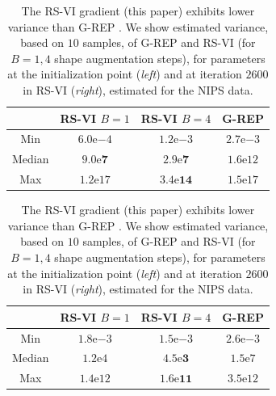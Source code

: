 \begin{table}[t]
\centering
\begin{subtable}{0.45\textwidth}
\begin{tabular}{cccc}
\toprule
 & \gls{RS-VI} $B=1$ & \gls{RS-VI} $B=4$ &\gls{G-REP}\\ \hline
Min & $6.0\mathrm{e}{-4}$ & $1.2\mathrm{e}{-3}$ & $2.7\mathrm{e}{-3}$\\
Median & $\mathbf{9.0\mathrm{e}{7}}$ & $\mathbf{2.9\mathrm{e}{7}}$ & $1.6\mathrm{e}{12}$\\
Max & $1.2\mathrm{e}{17}$ & $\mathbf{3.4\mathrm{e}{14}}$ & $1.5\mathrm{e}{17}$ \\ \bottomrule 
\end{tabular}
\end{subtable}
\hspace*{15pt}
\begin{subtable}{0.45\textwidth}
\begin{tabular}{cccc}
\toprule
 & \gls{RS-VI} $B=1$ & \gls{RS-VI} $B=4$ &\gls{G-REP}\\ \hline
Min & $1.8\mathrm{e}{-3}$ & $1.5\mathrm{e}{-3}$ & $2.6\mathrm{e}{-3}$\\
Median & $1.2\mathrm{e}{4}$ & $\mathbf{4.5\mathrm{e}{3}}$ & $1.5\mathrm{e}{7}$\\
Max & $1.4\mathrm{e}{12}$ & $\mathbf{1.6\mathrm{e}{11}}$ & $3.5\mathrm{e}{12}$ \\ \bottomrule
\end{tabular}
\end{subtable}
\caption{The \gls{RS-VI} gradient (this paper) exhibits lower variance than \gls{G-REP} \citep{RuizTB2016}. We show estimated variance, based on $10$ samples, of \gls{G-REP} and \gls{RS-VI} (for $B=1,4$ shape augmentation steps), for parameters at the initialization point (\emph{left}) and at iteration $2600$ in \gls{RS-VI} (\emph{right}), estimated for the \gls{NIPS} data.}\label{tab:vardef}
\end{table}


